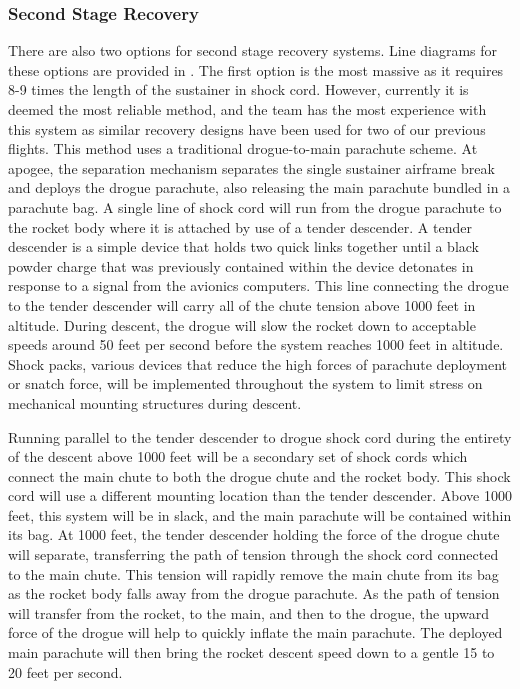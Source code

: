 \subsubsection{Second Stage Recovery}
There are also two options for second stage recovery systems. Line diagrams for these options are provided in . The first option is the most massive as it requires 8-9 times the length of the sustainer in shock cord. However, currently it is deemed the most reliable method, and the team has the most experience with this system as similar recovery designs have been used for two of our previous flights. This method uses a traditional drogue-to-main parachute scheme. At apogee, the separation mechanism separates the single sustainer airframe break and deploys the drogue parachute, also releasing the main parachute bundled in a parachute bag. A single line of shock cord will run from the drogue parachute to the rocket body where it is attached by use of a tender descender. A tender descender is a simple device that holds two quick links together until a black powder charge that was previously contained within the device detonates in response to a signal from the avionics computers. This line connecting the drogue to the tender descender will carry all of the chute tension above 1000 feet in altitude. During descent, the drogue will slow the rocket down to acceptable speeds around 50 feet per second before the system reaches 1000 feet in altitude. Shock packs, various devices that reduce the high forces of parachute deployment or snatch force, will be implemented throughout the system to limit stress on mechanical mounting structures during descent. 

Running parallel to the tender descender to drogue shock cord during the entirety of the descent above 1000 feet will be a secondary set of shock cords which connect the main chute to both the drogue chute and the rocket body. This shock cord will use a different mounting location than the tender descender. Above 1000 feet, this system will be in slack, and the main parachute will be contained within its bag. At 1000 feet, the tender descender holding the force of the drogue chute will separate, transferring the path of tension through the shock cord connected to the main chute. This tension will rapidly remove the main chute from its bag as the rocket body falls away from the drogue parachute. As the path of tension will transfer from the rocket, to the main, and then to the drogue, the upward force of the drogue will help to quickly inflate the main parachute. The deployed main parachute will then bring the rocket descent speed down to a gentle 15 to 20 feet per second. 

